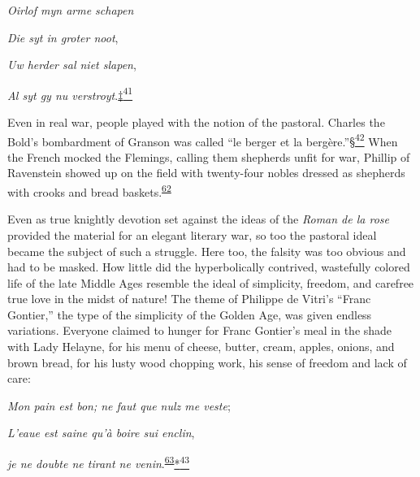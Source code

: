 \emph{Oirlof myn arme schapen}

\emph{Die syt in groter noot},

\emph{Uw herder sal niet slapen},

\emph{Al syt gy nu
verstroyt}.\protect\hypertarget{11_Chapter_Four__THE_FORMS_OF_LOVE.xhtmlux5cux23id_2937}{\protect\hyperlink{23_NOTES.xhtmlux5cux23id_2938}{‡\textsuperscript{41}}}

Even in real war, people played with the notion of the pastoral. Charles
the Bold's bombardment of Granson was called ``le berger et la
bergère.''\protect\hypertarget{11_Chapter_Four__THE_FORMS_OF_LOVE.xhtmlux5cux23id_2939}{\protect\hyperlink{23_NOTES.xhtmlux5cux23id_2940}{§\textsuperscript{42}}}
When the French mocked the Flemings, calling them shepherds unfit for
war, Phillip of Ravenstein showed up on the field with twenty-four
nobles dressed as shepherds with crooks and bread
baskets.\textsuperscript{\protect\hypertarget{11_Chapter_Four__THE_FORMS_OF_LOVE.xhtmlux5cux23id_1365}{\protect\hyperlink{23_NOTES.xhtmlux5cux23id_1366}{62}}}

Even as true knightly devotion set against the ideas of the \emph{Roman
de la rose} provided the material for an elegant literary war, so too
the pastoral ideal became the subject of such a struggle. Here too, the
falsity was too obvious and had to be masked. How little did the
hyperbolically contrived, wastefully colored life of the late Middle
Ages resemble the ideal of simplicity, freedom, and carefree true love
in the midst of nature! The theme of Philippe de Vitri's ``Franc
Gontier,'' the type of the simplicity of the Golden Age, was
\protect\hypertarget{11_Chapter_Four__THE_FORMS_OF_LOVE.xhtmlux5cux23page_154}{}{}given
endless variations. Everyone claimed to hunger for Franc Gontier's meal
in the shade with Lady Helayne, for his menu of cheese, butter, cream,
apples, onions, and brown bread, for his lusty wood chopping work, his
sense of freedom and lack of care:

\emph{Mon pain est bon; ne faut que nulz me veste};

\emph{L'eaue est saine qu'à boire sui enclin},

\emph{je ne doubte ne tirant ne
venin}.\textsuperscript{\protect\hypertarget{11_Chapter_Four__THE_FORMS_OF_LOVE.xhtmlux5cux23id_1363}{\protect\hyperlink{23_NOTES.xhtmlux5cux23id_1364}{63}}}\protect\hypertarget{11_Chapter_Four__THE_FORMS_OF_LOVE.xhtmlux5cux23id_2941}{\protect\hyperlink{23_NOTES.xhtmlux5cux23id_2942}{*\textsuperscript{43}}}

